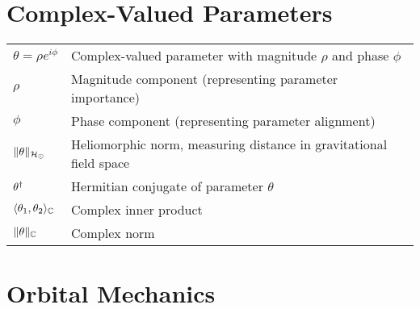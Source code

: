 \newpage
\section*{Complex-Valued Parameters}
\vspace{-0.5em}
\begin{tabular}{p{3cm} p{12cm}}
$\theta = \rho e^{i\phi}$ & Complex-valued parameter with magnitude $\rho$ and phase $\phi$ \\
$\rho$ & Magnitude component (representing parameter importance) \\
$\phi$ & Phase component (representing parameter alignment) \\
$\|\theta\|_{\mathcal{H}_{\odot}}$ & Heliomorphic norm, measuring distance in gravitational field space \\
$\theta^{\dagger}$ & Hermitian conjugate of parameter $\theta$ \\
$\langle \theta_1, \theta_2 \rangle_{\mathbb{C}}$ & Complex inner product \\
$\|\theta\|_{\mathbb{C}}$ & Complex norm \\
\end{tabular}

\newpage
\section*{Orbital Mechanics}

